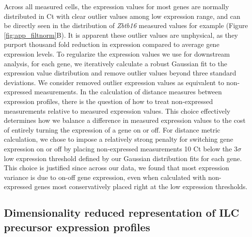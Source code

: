 \begin{subappendices}
Across all measured cells, the expression values for most genes are normally distributed in Ct with clear outlier values among low expression range, and can be directly seen in the distribution of \textit{Zbtb16} measured values for example (Figure \ref{fig:app_filtnorm}B). It is apparent these outlier values are unphysical, as they purport thousand fold reduction in expression compared to average gene expression levels. To regularize the expression values we use for downstream analysis, for each gene, we iteratively calculate a robust Gaussian fit to the expression value distribution and remove outlier values beyond three standard deviations. We consider removed outlier expression values as equivalent to non-expressed measurements. In the calculation of distance measures between expression profiles, there is the question of how to treat non-expressed measurements relative to measured expression values. This choice effectively determines how we balance a difference in measured expression values to the cost of entirely turning the expression of a gene on or off. For distance metric calculation, we chose to impose a relatively strong penalty for switching gene expression on or off by placing non-expressed measurements 10 Ct below the 3$\sigma$ low expression threshold defined by our Gaussian distribution fits for each gene. This choice is justified since across our data, we found that most expression variance is due to on-off gene expression, even when calculated with non-expressed genes most conservatively placed right at the low expression thresholds. 

\subsection{Dimensionality reduced representation of ILC precursor expression profiles}


\end{subappendices}
